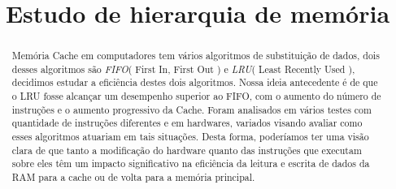 \documentclass[conference]{IEEEtran}
\begin{document}
\title{Estudo de hierarquia de memória}

\author{
\and
{}
\and
{}
\and
{}
}

\maketitle

\begin{abstract}
   Memória Cache em computadores tem vários algoritmos de 
  substituição de dados, dois desses algoritmos são \emph{FIFO}( First In, First Out )
  e \emph{LRU}( Least Recently Used ), decidimos estudar a eficiência destes dois algoritmos.
  Nossa ideia antecedente é de que o LRU fosse alcançar um desempenho superior ao FIFO, com o 
  aumento do número de instruções e o aumento progressivo da Cache. Foram analisados
  em vários testes com quantidade de instruções diferentes e em hardwares,
  variados visando avaliar como esses algoritmos atuariam em tais situações.
  Desta forma, poderíamos ter uma visão clara de que tanto a modificação
  do hardware quanto das instruções que executam sobre eles têm um impacto significativo
  na eficiência da leitura e escrita de dados da RAM para a cache ou de volta para a memória
  principal.
\end{abstract}
\end{document}
